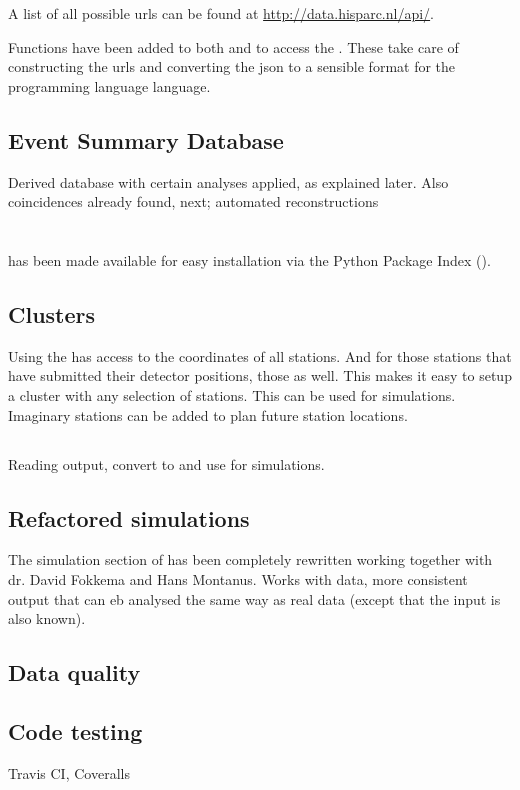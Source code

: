 A list of all possible urls can be found at \url{http://data.hisparc.nl/api/}.

Functions have been added to both \sapphire and \jsparc to access the
\api. These take care of constructing the urls and converting the json to a
sensible format for the programming language language.


\subsection{Event Summary Database}

Derived database with certain analyses applied, as explained later. Also
coincidences already found, next; automated reconstructions


\section{\sapphire}


\subsection{\pypi}

\sapphire has been made available for easy installation via the Python
Package Index (\pypi).


\subsection{Clusters}

Using the \api \sapphire has access to the \gps coordinates of all
stations. And for those stations that have submitted their detector
positions, those as well. This makes it easy to setup a cluster with any
selection of \hisparc stations. This can be used for simulations.
Imaginary stations can be added to plan future station locations.

\subsection{\corsika}

Reading \corsika output, convert to \hdf and use for simulations.


\subsection{Refactored simulations}

The simulation section of \sapphire has been completely rewritten
working together with dr. David Fokkema and Hans Montanus. Works with
\corsika data, more consistent output that can eb analysed the same way
as real \hisparc data (except that the input is also known).


\subsection{Data quality}



\subsection{Code testing}

Travis CI, Coveralls
